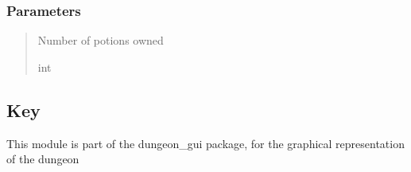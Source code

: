 \documentclass[letterpaper,10pt,english]{sphinxmanual}
\begin{document}
\begin{fulllineitems}
\begin{fulllineitems}
\subsubsection{Parameters}
\label{\detokenize{api_reference/dungeon_gui/hud:id7}}\begin{quote}\begin{description}
\sphinxAtStartPar
Number of potions owned

\sphinxAtStartPar
int

\end{description}\end{quote}

\end{fulllineitems}


\end{fulllineitems}


\sphinxstepscope


\subsection{Key}
\label{\detokenize{api_reference/dungeon_gui/Key:module-Key}}\label{\detokenize{api_reference/dungeon_gui/Key:key}}\label{\detokenize{api_reference/dungeon_gui/Key::doc}}
\sphinxAtStartPar
This module is part of the dungeon\_gui package, for the graphical representation of the dungeon
\end{document}
